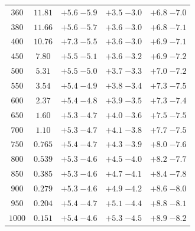 \begin{table}
\begin{center}
\begin{tabular}{ccccc}
 $360 $&$ 11.81 $& $ {+ 5.6}  \;{- 5.9} $ & $ {+ 3.5}  \;{- 3.0} $ & $ {+ 6.8}  \;{- 7.0} $ \\
 $380 $&$ 11.66 $& $ {+ 5.6}  \;{- 5.7} $ & $ {+ 3.6}  \;{- 3.0} $ & $ {+ 6.8}  \;{- 7.1} $ \\
 $400 $&$ 10.76 $& $ {+ 7.3}  \;{- 5.5} $ & $ {+ 3.6}  \;{- 3.0} $ & $ {+ 6.9}  \;{- 7.1} $ \\
 $450 $&$  7.80 $& $ {+ 5.5}  \;{- 5.1} $ & $ {+ 3.6}  \;{- 3.2} $ & $ {+ 6.9}  \;{- 7.2} $ \\
 $500 $&$  5.31 $& $ {+ 5.5}  \;{- 5.0} $ & $ {+ 3.7}  \;{- 3.3} $ & $ {+ 7.0}  \;{- 7.2} $ \\
 $550 $&$  3.54 $& $ {+ 5.4}  \;{- 4.9} $ & $ {+ 3.8}  \;{- 3.4} $ & $ {+ 7.3}  \;{- 7.5} $ \\
 $600 $&$  2.37 $& $ {+ 5.4}  \;{- 4.8} $ & $ {+ 3.9}  \;{- 3.5} $ & $ {+ 7.3}  \;{- 7.4} $ \\
 $650 $&$  1.60 $& $ {+ 5.3}  \;{- 4.7} $ & $ {+ 4.0}  \;{- 3.6} $ & $ {+ 7.5}  \;{- 7.5} $ \\
 $700 $&$  1.10 $& $ {+ 5.3}  \;{- 4.7} $ & $ {+ 4.1}  \;{- 3.8} $ & $ {+ 7.7}  \;{- 7.5} $ \\
 $750 $&$  0.765 $& $ {+ 5.4}  \;{- 4.7} $ & $ {+ 4.3}  \;{- 3.9} $ & $ {+ 8.0}  \;{- 7.6} $ \\
 $800 $&$  0.539 $& $ {+ 5.3}  \;{- 4.6} $ & $ {+ 4.5}  \;{- 4.0} $ & $ {+ 8.2}  \;{- 7.7} $ \\
 $850 $&$  0.385 $& $ {+ 5.3}  \;{- 4.6} $ & $ {+ 4.7}  \;{- 4.1} $ & $ {+ 8.4}  \;{- 7.8} $ \\
 $900 $&$  0.279 $& $ {+ 5.3}  \;{- 4.6} $ & $ {+ 4.9}  \;{- 4.2} $ & $ {+ 8.6}  \;{- 8.0} $ \\
 $950 $&$  0.204 $& $ {+ 5.4}  \;{- 4.7} $ & $ {+ 5.1}  \;{- 4.4} $ & $ {+ 8.8}  \;{- 8.1} $ \\
$1000 $&$  0.151 $& $ {+ 5.4}  \;{- 4.6} $ & $ {+ 5.3}  \;{- 4.5} $ & $ {+ 8.9}  \;{- 8.2} $ \\


\hline
\end{tabular}
\end{center}
\end{table}


